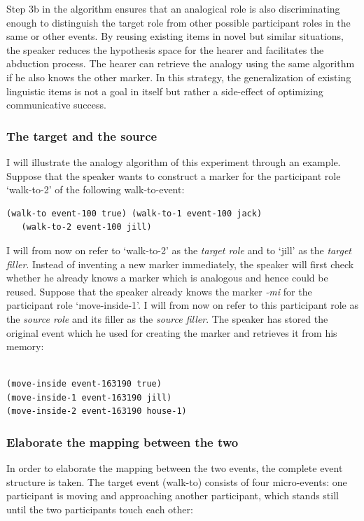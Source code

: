 Step 3b in the algorithm ensures that an analogical role is also discriminating enough to distinguish the target role from other possible participant roles in the same or other events. By reusing existing items in novel but similar situations, the speaker reduces the hypothesis space for the hearer and facilitates the abduction process. The hearer can retrieve the analogy using the same algorithm if he also knows the other marker. In this strategy, the generalization of existing linguistic items is not a goal in itself but rather a side-effect of optimizing communicative success.


\subsubsection{The target and the source}
 I will illustrate the analogy algorithm of this experiment through an example. Suppose that the speaker wants to construct a marker for the participant role `walk-to-2' of the following walk-to-event:

\ea
\begin{lstlisting}
(walk-to event-100 true) (walk-to-1 event-100 jack)
   (walk-to-2 event-100 jill)
\end{lstlisting}
\z

I will from now on refer to `walk-to-2' as the {\em target role} and to `jill' as the {\em target filler}. Instead of inventing a new marker immediately, the speaker will first check whether he already knows a marker which is analogous and hence could be reused. Suppose that the speaker already knows the marker {\em -mi} for the participant role `move-inside-1'. I will from now on refer to this participant role as the {\em source role} and its filler as the {\em source filler}. The speaker has stored the original event which he used for creating the marker and retrieves it from his memory:

\ea
\begin{lstlisting}
 
(move-inside event-163190 true) 
(move-inside-1 event-163190 jill)
(move-inside-2 event-163190 house-1)
\end{lstlisting}
\z

\subsubsection{Elaborate the mapping between the two}
 In order to elaborate the mapping between the two events, the complete event structure is taken. The target event (walk-to) consists of four micro-events: one participant is moving and approaching another participant, which stands still until the two participants touch each other:

